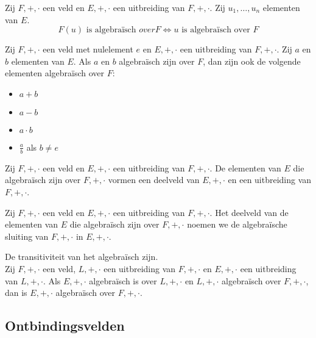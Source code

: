 \documentclass[main.tex]{subfiles}
\begin{document}
\begin{st}
  Zij $F,+,\cdot$ een veld en $E,+,\cdot$ een uitbreiding van $F,+,\cdot$.
  Zij $u_{1},\dotsc,u_{n}$ elementen van $E$.
  \[ F(u) \text{ is algebra\"isch } over F \Leftrightarrow u \text{ is algebra\"isch over } F \]
\end{st}

\begin{st}
  Zij $F,+,\cdot$ een veld met nulelement $e$ en $E,+,\cdot$ een uitbreiding van $F,+,\cdot$.
  Zij $a$ en $b$ elementen van $E$.
  Als $a$ en $b$ algebra\"isch zijn over $F$, dan zijn ook de volgende elementen algebra\"isch over $F$:
  \begin{itemize}
  \item $a+b$
  \item $a-b$
  \item $a\cdot b$
  \item $\frac{a}{b}$ als $b \neq e$
  \end{itemize}
\end{st}

\begin{gev}
  Zij $F,+,\cdot$ een veld en $E,+,\cdot$ een uitbreiding van $F,+,\cdot$.
  De elementen van $E$ die algebra\"isch zijn over $F,+,\cdot$ vormen een deelveld van $E,+,\cdot$ en een uitbreiding van $F,+,\cdot$.
\end{gev}

\begin{de}
  Zij $F,+,\cdot$ een veld en $E,+,\cdot$ een uitbreiding van $F,+,\cdot$.
  Het deelveld van de elementen van $E$ die algebra\"isch zijn over $F,+,\cdot$ noemen we de algebra\"ische sluiting van $F,+,\cdot$ in $E,+,\cdot$.
\end{de}

\begin{st}
  De transitiviteit van het algebra\"isch zijn.\\
  Zij $F,+,\cdot$ een veld, $L,+,\cdot$ een uitbreiding van $F,+,\cdot$ en $E,+,\cdot$ een uitbreiding van $L,+,\cdot$.
  Als $E,+,\cdot$ algebra\"isch is over $L,+,\cdot$ en $L,+,\cdot$ algebra\"isch over $F,+,\cdot$, dan is $E,+,\cdot$ algebra\"isch over $F,+,\cdot$.
\end{st}

\subsection{Ontbindingsvelden}
\label{sec:ontbindingsvelden}
\end{document}
